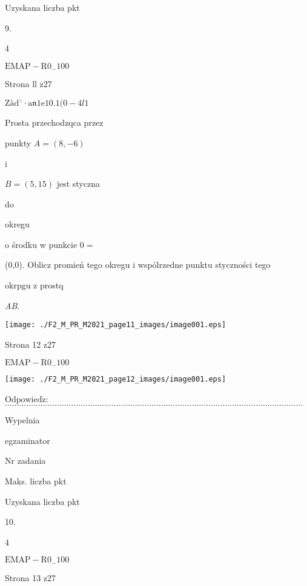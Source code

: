 \documentclass[a4paper,12pt]{article}
\begin{document}
Uzyskana liczba pkt

9.

4

$\mathrm{E}\mathrm{M}\mathrm{A}\mathrm{P}-\mathrm{R}0_{-}100$

Strona ll z27





$\mathrm{Z}\text{à} \mathrm{d}^{\backslash }\cdot \mathrm{a}\mathfrak{n}1\mathrm{e}10. 1(0-4l1$

Prosta przechodzqca przez

punkty $A = (8,-6)$

i

$B = (5,15)$ jest styczna

do

okregu

o środku w punkcie $0 =$

(0,0). Oblicz promień tego okregu i wspólrzedne punktu styczności tego

okrpgu z prostq

{\it AB}.
\begin{center}
\texttt{[image: ./F2\_M\_PR\_M2021\_page11\_images/image001.eps]}
\end{center}
Strona 12 z27

$\mathrm{E}\mathrm{M}\mathrm{A}\mathrm{P}-\mathrm{R}0_{-}100$




\begin{center}
\texttt{[image: ./F2\_M\_PR\_M2021\_page12\_images/image001.eps]}
\end{center}
$\mathrm{O}\mathrm{d}\mathrm{p}\mathrm{o}\mathrm{w}\mathrm{i}\mathrm{e}\mathrm{d}\acute{\mathrm{z}}$:$\ldots\ldots\ldots\ldots\ldots\ldots\ldots\ldots\ldots\ldots\ldots\ldots\ldots\ldots\ldots\ldots\ldots\ldots\ldots\ldots\ldots\ldots\ldots\ldots\ldots\ldots\ldots\ldots\ldots\ldots\ldots\ldots\ldots\ldots\ldots\ldots\ldots\ldots\ldots\ldots\ldots\ldots$

Wypelnia

egzaminator

Nr zadania

Maks. liczba pkt

Uzyskana liczba pkt

10.

4

$\mathrm{E}\mathrm{M}\mathrm{A}\mathrm{P}-\mathrm{R}0_{-}100$

Strona 13 z27
\end{document}
